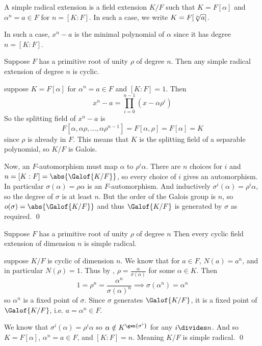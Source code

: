 \bdefn

    A {\emphcolor simple radical extension} is a field extension $K/F$ such that $K=F[\alpha]$ and $\alpha^n=a\in F$ for $n=[K:F]$.
    In such a case, we write $K=F[\root n\of a]$.

\edefn

In such a case, $x^n-a$ is the minimal polynomial of $\alpha$ since it has degree $n=[K:F]$.

\bprop

    Suppose $F$ has a primitive root of unity $\rho$ of degree $n$.
    Then any simple radical extension of degree $n$ is cyclic.

\eprop

\Proof suppose $K=F[\alpha]$ for $\alpha^n=a\in F$ and $[K:F]=1$.
Then
$$ x^n - a = \prod_{i=0}^{n-1}(x-\alpha\rho^i) $$
So the splitting field of $x^n-a$ is
$$ F[\alpha,\alpha\rho,\dots,\alpha\rho^{n-1}] = F[\alpha,\rho] = F[\alpha] = K $$
since $\rho$ is already in $F$.
This means that $K$ is the splitting field of a separable polynomial, so $K/F$ is Galois.

Now, an $F$-automorphism must map $\alpha$ to $\rho^i\alpha$.
There are $n$ choices for $i$ and $n=[K:F]=\abs{\Galof{K/F}}$, so every choice of $i$ gives an automorphism.
In particular $\sigma(\alpha)=\rho\alpha$ is an $F$-automorphism.
And inductively $\sigma^i(\alpha)=\rho^i\alpha$, so the degree of $\sigma$ is at least $n$.
But the order of the Galois group is $n$, so $o(\sigma)=\abs{\Galof{K/F}}$ and thus $\Galof{K/F}$ is generated by $\sigma$ as required.
\qed

\bthrm[title=Kummer's Theorem, name=kummer]

    Suppose $F$ has a primitive root of unity $\rho$ of degree $n$
    Then every cyclic field extension of dimension $n$ is simple radical.

\ethrm

\Proof suppose $K/F$ is cyclic of dimension $n$.
We know that for $a\in F$, $N(a)=a^n$, and in particular $N(\rho)=1$.
Thus by , $\rho=\frac\alpha{\sigma(\alpha)}$ for some $\alpha\in K$.
Then
$$ 1 = \rho^n = \frac{\alpha^n}{\sigma(\alpha)^n} \implies \sigma(\alpha^n) = \alpha^n $$
so $\alpha^n$ is a fixed point of $\sigma$.
Since $\sigma$ generates $\Galof{K/F}$, it is a fixed point of $\Galof{K/F}$, i.e. $a=\alpha^n\in F$.

We know that $\sigma^i(\alpha)=\rho^i\alpha$ so $\alpha\notin K^{\gen{\sigma^i}}$ for any $i\divides n$.
And so $K=F[\alpha]$, $\alpha^n=a\in F$, and $[K:F]=n$.
Meaning $K/F$ is simple radical.
\qed

